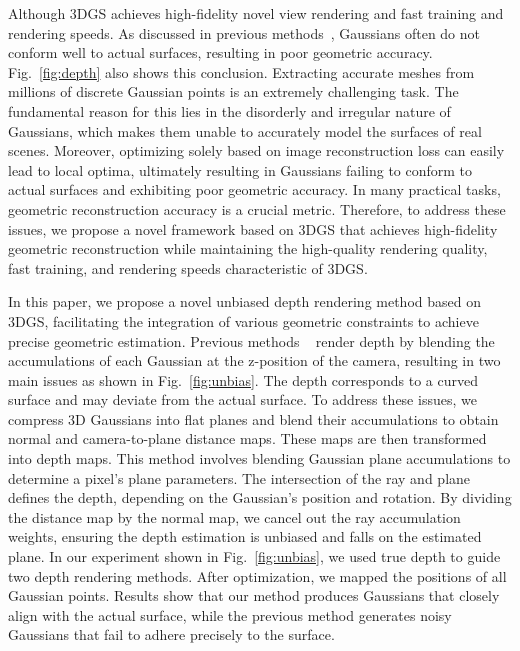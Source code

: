 \documentclass[lettersize,journal]{IEEEtran}
\begin{document}
Although 3DGS achieves high-fidelity novel view rendering and fast training and rendering speeds. As discussed in previous methods~\cite{guedon2023sugar,jiang2023gaussianshader}, Gaussians often do not conform well to actual surfaces, resulting in poor geometric accuracy. Fig.~\ref{fig:depth} also shows this conclusion. Extracting accurate meshes from millions of discrete Gaussian points is an extremely challenging task. The fundamental reason for this lies in the disorderly and irregular nature of Gaussians, which makes them unable to accurately model the surfaces of real scenes. Moreover, optimizing solely based on image reconstruction loss can easily lead to local optima, ultimately resulting in Gaussians failing to conform to actual surfaces and exhibiting poor geometric accuracy. In many practical tasks, geometric reconstruction accuracy is a crucial metric. Therefore, to address these issues, we propose a novel framework based on 3DGS that achieves high-fidelity geometric reconstruction while maintaining the high-quality rendering quality, fast training, and rendering speeds characteristic of 3DGS.

In this paper, we propose a novel unbiased depth rendering method based on 3DGS, facilitating the integration of various geometric constraints to achieve precise geometric estimation. Previous methods ~\cite{jiang2023gaussianshader} render depth by blending the accumulations of each Gaussian at the z-position of the camera, resulting in two main issues as shown in Fig.~\ref{fig:unbias}. The depth corresponds to a curved surface and may deviate from the actual surface. To address these issues, we compress 3D Gaussians into flat planes and blend their accumulations to obtain normal and camera-to-plane distance maps. These maps are then transformed into depth maps. This method involves blending Gaussian plane accumulations to determine a pixel's plane parameters. The intersection of the ray and plane defines the depth, depending on the Gaussian's position and rotation. By dividing the distance map by the normal map, we cancel out the ray accumulation weights, ensuring the depth estimation is unbiased and falls on the estimated plane. In our experiment shown in Fig.~\ref{fig:unbias}, we used true depth to guide two depth rendering methods. After optimization, we mapped the positions of all Gaussian points. Results show that our method produces Gaussians that closely align with the actual surface, while the previous method generates noisy Gaussians that fail to adhere precisely to the surface.
\end{document}
